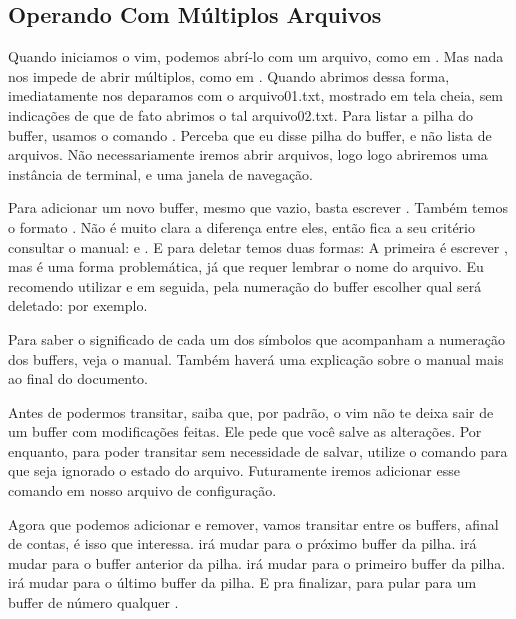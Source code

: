 \documentclass[a4paper, 12pt]{article}
\begin{document}
\subsection{Operando Com Múltiplos Arquivos}
Quando iniciamos o vim, podemos abrí-lo com um arquivo, como em .
Mas nada nos impede de abrir múltiplos, como em .
Quando abrimos dessa forma, imediatamente nos deparamos com o arquivo01.txt, mostrado em tela cheia,
sem indicações de que de fato abrimos o tal arquivo02.txt.
Para listar a pilha do buffer, usamos o comando .
Perceba que eu disse pilha do buffer, e não lista de arquivos.
Não necessariamente iremos abrir arquivos, logo logo abriremos uma instância de terminal, e uma janela de navegação.

Para adicionar um novo buffer, mesmo que vazio, basta escrever \newline
{}.
Também temos o formato .
Não é muito clara a diferença entre eles, então fica a seu critério consultar o manual:  e .
E para deletar temos duas formas: A primeira é escrever , mas
é uma forma problemática, já que requer lembrar o nome do arquivo.
Eu recomendo utilizar  e em seguida, pela numeração do buffer escolher qual será deletado:
 por exemplo.

Para saber o significado de cada um dos símbolos que acompanham a numeração dos buffers, veja o manual.
Também haverá uma explicação sobre o manual mais ao final do documento.

Antes de podermos transitar, saiba que, por padrão, o vim não te deixa sair de um buffer com modificações feitas.
Ele pede que você salve as alterações.
Por enquanto, para poder transitar sem necessidade de salvar, utilize o comando  para
que seja ignorado o estado do arquivo.
Futuramente iremos adicionar esse comando em nosso arquivo de configuração.

Agora que podemos adicionar e remover, vamos transitar entre os buffers, afinal de contas, é isso que interessa.
 irá mudar para o próximo buffer da pilha.
 irá mudar para o buffer anterior da pilha.
 irá mudar para o primeiro buffer da pilha.
 irá mudar para o último buffer da pilha.
E pra finalizar, para pular para um buffer de número qualquer .
\end{document}
